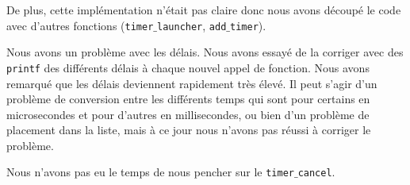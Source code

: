 \documentclass[a4paper, 12pt]{article}
\begin{document}
	De plus, cette implémentation n'était pas claire donc nous avons découpé le code avec d'autres fonctions (\texttt{timer$\_$launcher}, \texttt{add$\_$timer}).
	
	Nous avons un problème avec les délais. Nous avons essayé de la corriger avec des \texttt{printf} des différents délais à chaque nouvel appel de fonction. Nous avons remarqué que les délais deviennent rapidement très élevé. Il peut s'agir d'un problème de conversion entre les différents temps qui sont pour certains en microsecondes et pour d'autres en millisecondes, ou bien d'un problème de placement dans la liste, mais à ce jour nous n'avons pas réussi à corriger le problème.
	
	Nous n'avons pas eu le temps de nous pencher sur le \texttt{timer$\_$cancel}.
\end{document}
